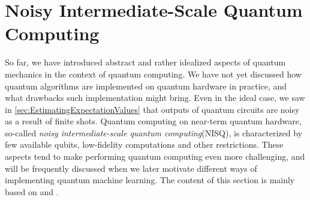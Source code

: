 %

\section{Noisy Intermediate-Scale Quantum Computing}\label{sec:Nisq}
So far, we have introduced abstract and rather idealized aspects of quantum mechanics in the context of quantum computing. We have not yet discussed how quantum algorithms are implemented on quantum hardware in practice, and what drawbacks such implementation might bring. Even in the ideal case, we saw in \autoref{sec:EstimatingExpectationValues} that outputs of quantum circuits are noisy as a result of finite shots. Quantum computing on near-term quantum hardware, so-called \emph{noisy intermediate-scale quantum computing}(NISQ)\cite{Preskill_2018}, is characterized by few available qubits, low-fidelity computations and other restrictions. These aspects tend to make performing quantum computing even more challenging, and will be frequently discussed when we later motivate different ways of implementing quantum machine learning. The content of this section is mainly based on \citet{SupervisedwquantumComputers} and \citet{Preskill_2018}.


